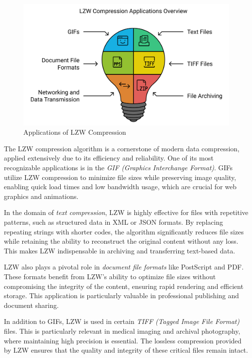 \begin{figure}[ht]
    \centering
    \includegraphics[width=0.8\linewidth]{Figures/application.png}
    \caption{Applications of LZW Compression}
\end{figure}

The LZW compression algorithm is a cornerstone of modern data compression, applied extensively due to its efficiency and reliability. One of its most recognizable applications is in the \textit{GIF (Graphics Interchange Format)}. GIFs utilize LZW compression to minimize file sizes while preserving image quality, enabling quick load times and low bandwidth usage, which are crucial for web graphics and animations.

\vspace{10pt}

In the domain of \textit{text compression}, LZW is highly effective for files with repetitive patterns, such as structured data in XML or JSON formats. By replacing repeating strings with shorter codes, the algorithm significantly reduces file sizes while retaining the ability to reconstruct the original content without any loss. This makes LZW indispensable in archiving and transferring text-based data.

\vspace{10pt}

LZW also plays a pivotal role in \textit{document file formats} like PostScript and PDF. These formats benefit from LZW's ability to optimize file sizes without compromising the integrity of the content, ensuring rapid rendering and efficient storage. This application is particularly valuable in professional publishing and document sharing.

\vspace{10pt}

In addition to GIFs, LZW is used in certain \textit{TIFF (Tagged Image File Format)} files. This is particularly relevant in medical imaging and archival photography, where maintaining high precision is essential. The lossless compression provided by LZW ensures that the quality and integrity of these critical files remain intact.
\vspace{10pt}

